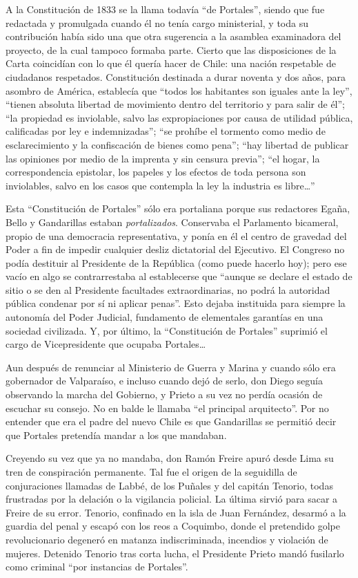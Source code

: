 \documentclass[10pt,twoside,openright]{memoir}
\begin{document}
A la Constitución de 1833 se la llama todavía ``de Portales'', siendo que
fue redactada y promulgada cuando él no tenía cargo ministerial, y toda
su contribución había sido una que otra sugerencia a la asamblea
examinadora del proyecto, de la cual tampoco formaba parte. Cierto que
las disposiciones de la Carta coincidían con lo que él quería hacer de
Chile: una nación respetable de ciudadanos respetados. Constitución
destinada a durar noventa y dos años, para asombro de América,
establecía que ``todos los habitantes son iguales ante la ley'', ``tienen
absoluta libertad de movimiento dentro del territorio y para salir de
él''; ``la propiedad es inviolable, salvo las expropiaciones por causa de
utilidad pública, calificadas por ley e indemnizadas''; ``se prohíbe el
tormento como medio de esclarecimiento y la confiscación de bienes como
pena''; ``hay libertad de publicar las opiniones por medio de la imprenta
y sin censura previa''; ``el hogar, la correspondencia epistolar, los
papeles y los efectos de toda persona son inviolables, salvo en los
casos que contempla la ley la industria es libre\ldots''

Esta ``Constitución de Portales'' sólo era portaliana porque sus
redactores Egaña, Bello y Gandarillas estaban \emph{portalizados}.
Conservaba el Parlamento bicameral, propio de una democracia
representativa, y ponía en él el centro de gravedad del Poder a fin de
impedir cualquier desliz dictatorial del Ejecutivo. El Congreso no podía
destituir al Presidente de la República (como puede hacerlo hoy); pero
ese vacío en algo se contrarrestaba al establecerse que ``aunque se
declare el estado de sitio o se den al Presidente facultades
extraordinarias, no podrá la autoridad pública condenar por sí ni
aplicar penas''. Esto dejaba instituida para siempre la autonomía del
Poder Judicial, fundamento de elementales garantías en una sociedad
civilizada. Y, por último, la ``Constitución de Portales'' suprimió el
cargo de Vicepresidente que ocupaba Portales\ldots

Aun después de renunciar al Ministerio de Guerra y Marina y cuando sólo
era gobernador de Valparaíso, e incluso cuando dejó de serlo, don Diego
seguía observando la marcha del Gobierno, y Prieto a su vez no perdía
ocasión de escuchar su consejo. No en balde le llamaba ``el principal
arquitecto''. Por no entender que era el padre del nuevo Chile es que
Gandarillas se permitió decir que Portales pretendía mandar a los que
mandaban.

Creyendo su vez que ya no mandaba, don Ramón Freire apuró desde Lima su
tren de conspiración permanente. Tal fue el origen de la seguidilla de
conjuraciones llamadas de Labbé, de los Puñales y del capitán Tenorio,
todas frustradas por la delación o la vigilancia policial. La última
sirvió para sacar a Freire de su error. Tenorio, confinado en la isla de
Juan Fernández, desarmó a la guardia del penal y escapó con los reos a
Coquimbo, donde el pretendido golpe revolucionario degeneró en matanza
indiscriminada, incendios y violación de mujeres. Detenido Tenorio tras
corta lucha, el Presidente Prieto mandó fusilarlo como criminal ``por
instancias de Portales''.
\end{document}
